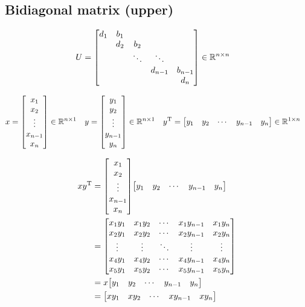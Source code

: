 \documentclass[11pt]{article}
\newcommand{\T}{\mathrm{T}}
\begin{document}
\subsection{Bidiagonal matrix (upper)}





\begin{align*}
    U &= \mqty[
        d_{1} & b_{1} &   &   &  \\
          & d_{2} & b_{2} &   &  \\
          &   & \ddots & \ddots &  \\
          &   &   & d_{n-1} & b_{n-1}\\
          &   &   &   & d_{n}
    ] \in \mathbb{R}^{n \times n}
\end{align*}




\begin{align*}
    x &= \mqty[
        x_{1} \\
        x_{2} \\
        \vdots \\
        x_{n-1} \\
        x_{n}
        ]
    \in \mathbb{R}^{n \times 1}
    &
    y &= \mqty[
        y_{1} \\
        y_{2} \\
        \vdots \\
        y_{n-1} \\
        y_{n}
        ]
    \in \mathbb{R}^{n \times 1}
    &
    y^{\T} &= \mqty[
        y_{1} & y_{2} & \cdots & y_{n-1} & y_{n}
        ] \in \mathbb{R}^{1 \times n}
\end{align*}



\begin{align*}
    xy^{\T} &= \mqty[
        x_{1} \\
        x_{2} \\
        \vdots \\
        x_{n-1} \\
        x_{n}
        ]
        \mqty[
        y_{1} & y_{2} & \cdots & y_{n-1} & y_{n}
        ]\\
    &= \mqty[
        x_{1} y_{1} & x_{1} y_{2} & \cdots & x_{1} y_{n-1} & x_{1} y_{n}\\
        x_{2} y_{1} & x_{2} y_{2} & \cdots & x_{2} y_{n-1} & x_{2} y_{n}\\
        \vdots & \vdots & \ddots & \vdots & \vdots\\
        x_{4} y_{1} & x_{4} y_{2} & \cdots & x_{4} y_{n-1} & x_{4} y_{n}\\
        x_{5} y_{1} & x_{5} y_{2} & \cdots & x_{5} y_{n-1} & x_{5} y_{n}
        ]\\
    &= x\mqty[
            y_{1} & y_{2} & \cdots & y_{n-1} & y_{n}
            ]\\
    &= \mqty[
        xy_{1} & xy_{2} & \cdots & xy_{n-1} & xy_{n}
        ]
\end{align*}
\end{document}
